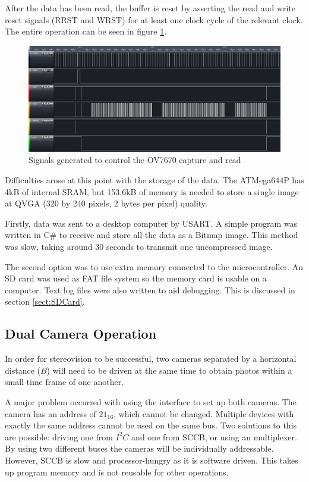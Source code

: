 After the data has been read, the buffer is reset by asserting the read and write reset signals (RRST and WRST) for at least one clock cycle of the relevant clock. The entire operation can be seen in figure \ref{fig:ov_Capture}.
\begin{figure}
\includegraphics[width = \textwidth]{./Figures/ov7670_im_capture.png}
\caption{Signals generated to control the OV7670 capture and read}
\label{fig:ov_Capture}
\end{figure}


Difficulties arose at this point with the storage of the data. The ATMega644P has 4kB of internal SRAM, but  153.6kB of memory is needed to store a single image at QVGA (320 by 240 pixels, 2 bytes per pixel) quality. 

Firstly, data was sent to a desktop computer by USART. A simple program was written in C\# to receive and store all the data as a Bitmap image. This method was slow, taking around 30 seconds to transmit one uncompressed image. 

The second option was to use extra memory connected to the microcontroller. An SD card was used as FAT file system so the memory card is usable on a computer. Text log files were also written to aid debugging. This is discussed in section \ref{sect:SDCard}. 

\subsection{Dual Camera Operation}
In order for stereovision to be successful, two cameras separated by a horizontal distance ($B$) will need to be driven at the same time to obtain photos within a small time frame of one another.

A major problem occurred with using the \itc interface to set up both cameras. The camera has an \itc address of $21_{16}$, which cannot be changed. Multiple \itc devices with exactly the same address cannot be used on the same bus. 
Two solutions to this are possible: driving one from $I^{2}C$ and one from SCCB, or using an \itc multiplexer. By using two different buses the cameras will be individually addressable. However, SCCB is slow and processor-hungry as it is software driven. This takes up program memory and is not reusable for other operations.


